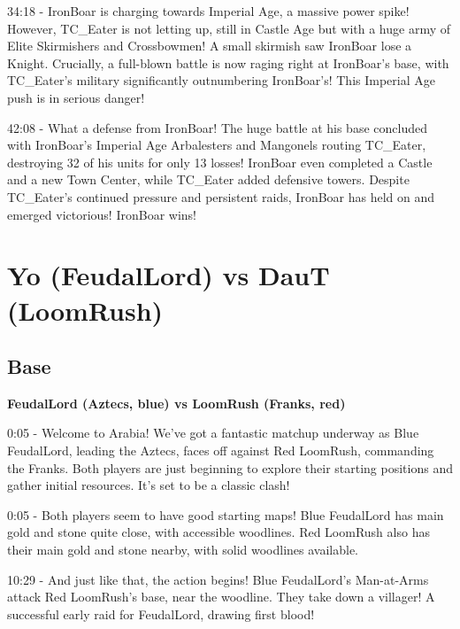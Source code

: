 34:18 - IronBoar is charging towards Imperial Age, a massive power spike! However, TC\_Eater is not letting up, still in Castle Age but with a huge army of Elite Skirmishers and Crossbowmen! A small skirmish saw IronBoar lose a Knight. Crucially, a full-blown battle is now raging right at IronBoar's base, with TC\_Eater’s military significantly outnumbering IronBoar’s! This Imperial Age push is in serious danger! \par \vspace{1em}

42:08 - What a defense from IronBoar! The huge battle at his base concluded with IronBoar's Imperial Age Arbalesters and Mangonels routing TC\_Eater, destroying 32 of his units for only 13 losses! IronBoar even completed a Castle and a new Town Center, while TC\_Eater added defensive towers. Despite TC\_Eater's continued pressure and persistent raids, IronBoar has held on and emerged victorious! IronBoar wins! \par \vspace{1em}

\section{Yo (FeudalLord) vs DauT (LoomRush)}
\label{appendix:yo-daut}
\subsection{Base}
\textbf{FeudalLord (Aztecs, blue) vs LoomRush (Franks, red)}

0:05 - Welcome to Arabia! We've got a fantastic matchup underway as Blue FeudalLord, leading the Aztecs, faces off against Red LoomRush, commanding the Franks. Both players are just beginning to explore their starting positions and gather initial resources. It's set to be a classic clash! \par \vspace{1em}

0:05 - Both players seem to have good starting maps! Blue FeudalLord has main gold and stone quite close, with accessible woodlines. Red LoomRush also has their main gold and stone nearby, with solid woodlines available. \par \vspace{1em}

10:29 - And just like that, the action begins! Blue FeudalLord's Man-at-Arms attack Red LoomRush's base, near the woodline. They take down a villager! A successful early raid for FeudalLord, drawing first blood! \par \vspace{1em}

